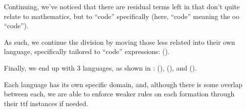 Continuing, we've noticed that there are residual terms left in \Expr{} that
don't quite relate to mathematics, but to ``code'' specifically (here, ``code''
meaning the \acs{oo} ``code'').

As such, we continue the division by moving those less related into their own
language, specifically tailored to ``code'' expressions: \CodeExpr{} ().




Finally, we end up with 3 languages, as shown in : \Expr{}
(), \ModelExpr{} (), and
\CodeExpr{} ().

Each language has its own specific domain, and, although there is some overlap
between each, we are able to enforce weaker rules on each formation through
their \acs{ttf} instances if needed.

